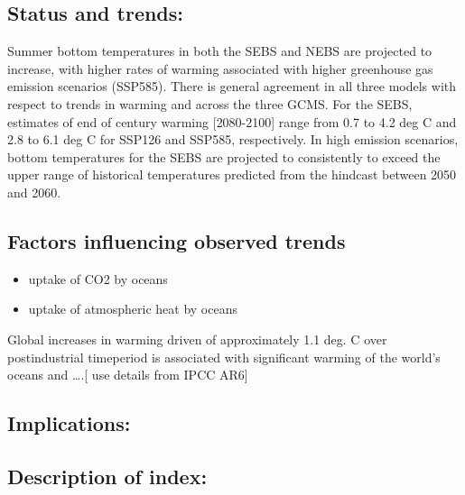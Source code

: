 \documentclass[
]{article}
\providecommand{\tightlist}{%
  \setlength{\itemsep}{0pt}\setlength{\parskip}{0pt}}
\begin{document}
\hypertarget{status-and-trends}{%
\subsection{Status and trends:}\label{status-and-trends}}

Summer bottom temperatures in both the SEBS and NEBS are projected to
increase, with higher rates of warming associated with higher greenhouse
gas emission scenarios (SSP585). There is general agreement in all three
models with respect to trends in warming and across the three GCMS. For
the SEBS, estimates of end of century warming {[}2080-2100{]} range from
0.7 to 4.2 deg C and 2.8 to 6.1 deg C for SSP126 and SSP585,
respectively. In high emission scenarios, bottom temperatures for the
SEBS are projected to consistently to exceed the upper range of
historical temperatures predicted from the hindcast between 2050 and
2060.

\hypertarget{factors-influencing-observed-trends}{%
\subsection{Factors influencing observed
trends}\label{factors-influencing-observed-trends}}

\begin{itemize}
\tightlist
\item
  uptake of CO2 by oceans
\item
  uptake of atmospheric heat by oceans
\end{itemize}

Global increases in warming driven of approximately 1.1 deg. C over
postindustrial timeperiod is associated with significant warming of the
world's oceans and \ldots.{[} use details from IPCC AR6{]}

\hypertarget{implications}{%
\subsection{Implications:}\label{implications}}

\hypertarget{description-of-index}{%
\subsection{Description of index:}\label{description-of-index}}
\end{document}
